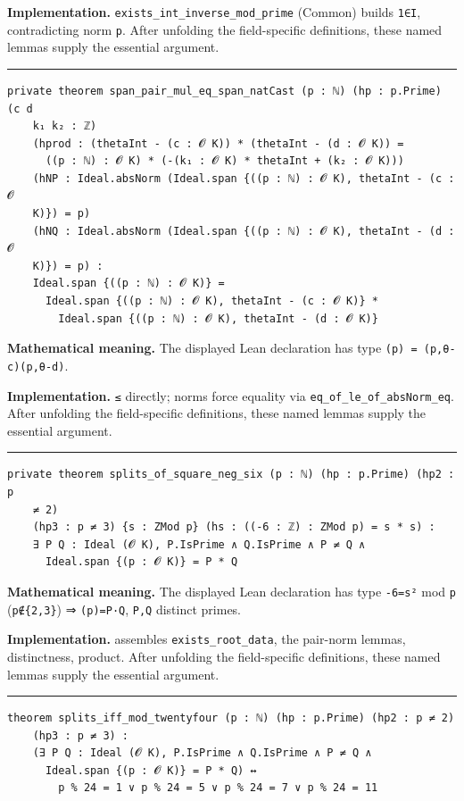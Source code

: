 \documentclass[UTF8,a4paper,11pt,fontset=fandol]{ctexart}
\theoremstyle{definition}
\newcommand{\statementsep}{\par\medskip\hrule\medskip}
\begin{document}
\noindent\textbf{Implementation.} \texttt{exists\_\allowbreak{}int\_\allowbreak{}inverse\_\allowbreak{}mod\_\allowbreak{}prime} (Common) builds \texttt{1∈I}, contradicting norm \texttt{p}. After unfolding the field-specific definitions, these named lemmas supply the essential argument.\par
\statementsep
\begin{verbatim}
private theorem span_pair_mul_eq_span_natCast (p : ℕ) (hp : p.Prime) (c d
    k₁ k₂ : ℤ)
    (hprod : (thetaInt - (c : 𝓞 K)) * (thetaInt - (d : 𝓞 K)) =
      ((p : ℕ) : 𝓞 K) * (-(k₁ : 𝓞 K) * thetaInt + (k₂ : 𝓞 K)))
    (hNP : Ideal.absNorm (Ideal.span {((p : ℕ) : 𝓞 K), thetaInt - (c : 𝓞
    K)}) = p)
    (hNQ : Ideal.absNorm (Ideal.span {((p : ℕ) : 𝓞 K), thetaInt - (d : 𝓞
    K)}) = p) :
    Ideal.span {((p : ℕ) : 𝓞 K)} =
      Ideal.span {((p : ℕ) : 𝓞 K), thetaInt - (c : 𝓞 K)} *
        Ideal.span {((p : ℕ) : 𝓞 K), thetaInt - (d : 𝓞 K)}
\end{verbatim}
\noindent\textbf{Mathematical meaning.} The displayed Lean declaration has type \texttt{(p) = (p,θ-c)(p,θ-d)}.\par
\noindent\textbf{Implementation.} \texttt{≤} directly; norms force equality via \texttt{eq\_\allowbreak{}of\_\allowbreak{}le\_\allowbreak{}of\_\allowbreak{}absNorm\_\allowbreak{}eq}. After unfolding the field-specific definitions, these named lemmas supply the essential argument.\par
\statementsep
\begin{verbatim}
private theorem splits_of_square_neg_six (p : ℕ) (hp : p.Prime) (hp2 : p
    ≠ 2)
    (hp3 : p ≠ 3) {s : ZMod p} (hs : ((-6 : ℤ) : ZMod p) = s * s) :
    ∃ P Q : Ideal (𝓞 K), P.IsPrime ∧ Q.IsPrime ∧ P ≠ Q ∧
      Ideal.span {(p : 𝓞 K)} = P * Q
\end{verbatim}
\noindent\textbf{Mathematical meaning.} The displayed Lean declaration has type \texttt{-6=s²} mod \texttt{p} (\texttt{p∉\{2,3\}}) ⇒ \texttt{(p)=P·Q}, \texttt{P,Q} distinct primes.\par
\noindent\textbf{Implementation.} assembles \texttt{exists\_\allowbreak{}root\_\allowbreak{}data}, the pair-norm lemmas, distinctness, product. After unfolding the field-specific definitions, these named lemmas supply the essential argument.\par
\statementsep
\begin{verbatim}
theorem splits_iff_mod_twentyfour (p : ℕ) (hp : p.Prime) (hp2 : p ≠ 2)
    (hp3 : p ≠ 3) :
    (∃ P Q : Ideal (𝓞 K), P.IsPrime ∧ Q.IsPrime ∧ P ≠ Q ∧
      Ideal.span {(p : 𝓞 K)} = P * Q) ↔
        p % 24 = 1 ∨ p % 24 = 5 ∨ p % 24 = 7 ∨ p % 24 = 11
\end{verbatim}
\end{document}
